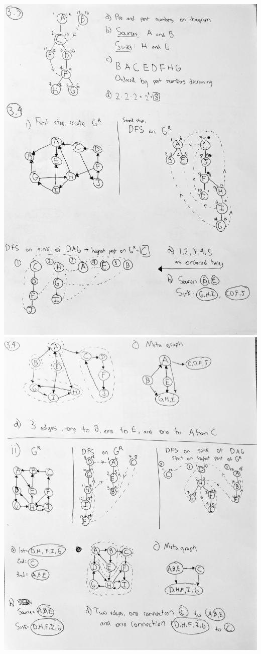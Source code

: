 \documentclass{article}
\begin{document}
\begin{center}
	   \includegraphics[scale=0.28]{2.jpg} \\
	   \includegraphics[scale=0.28]{3.jpg} \\

\end{center}
\end{document}
